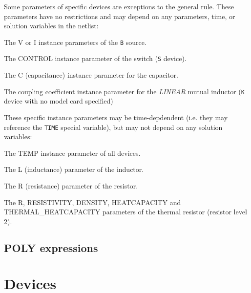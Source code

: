 Some parameters of specific devices are exceptions to the general
rule.  These parameters have no restrictions and may depend on any
parameters, time, or solution variables in the
netlist:
\begin{XyceItemize}
\item The \textrm{V} or \textrm{I} instance parameters of the
  \texttt{B} source.
\item The \textrm{CONTROL} instance parameter of the switch (\texttt{S}
  device).
\item The \textrm{C} (capacitance) instance parameter for the capacitor.
\item The coupling coefficient instance parameter for the {\em LINEAR}
  mutual inductor (\texttt{K} device with no model card specified)
\end{XyceItemize}

These specific instance parameters may be time-depdendent (i.e. they
may reference the \texttt{TIME} special variable), but may not depend
on any solution variables:

\begin{XyceItemize}
\item The \textrm{TEMP} instance parameter of all devices.
\item The \textrm{L} (inductance) parameter of the inductor.
\item The \textrm{R} (resistance) parameter of the resistor.
\item The \textrm{R}, \textrm{RESISTIVITY}, \textrm{DENSITY}, \textrm{HEATCAPACITY} and \textrm{THERMAL\_HEATCAPACITY} parameters of the thermal resistor (resistor level 2).
\end{XyceItemize}

\subsection{POLY expressions}
\label{PspicePoly}




\newpage
\section{Devices}
\label{Analog_Devices}

